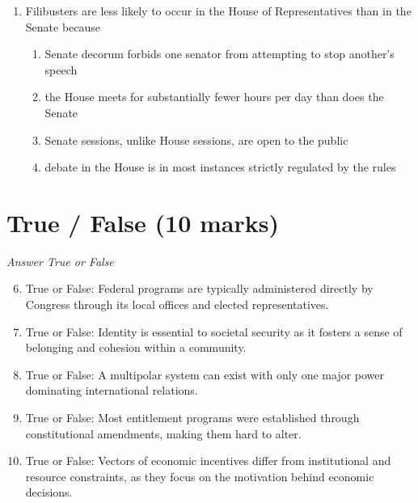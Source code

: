 \documentclass[12pt]{article}
\begin{document}
\begin{enumerate}[label=\arabic*.]
\begin{enumerate}[label=(\alph*)]
    \item Computer experts
    \item Anti-virus industry
    \item Computer networks
\end{enumerate}
\item Filibusters are less likely to occur in the House of Representatives than in the Senate because
\begin{enumerate}[label=(\alph*)]
    \item Senate decorum forbids one senator from attempting to stop another's speech
    \item the House meets for substantially fewer hours per day than does the Senate
    \item Senate sessions, unlike House sessions, are open to the public
    \item debate in the House is in most instances strictly regulated by the rules
\end{enumerate}
\end{enumerate}

\section*{True / False (10 marks)}
\textit{Answer True or False}
\begin{enumerate}[label=\arabic*.]
\setcounter{enumi}{5}
\item True or False: Federal programs are typically administered directly by Congress through its local offices and elected representatives.
\item True or False: Identity is essential to societal security as it fosters a sense of belonging and cohesion within a community.
\item True or False: A multipolar system can exist with only one major power dominating international relations.
\item True or False: Most entitlement programs were established through constitutional amendments, making them hard to alter.
\item True or False: Vectors of economic incentives differ from institutional and resource constraints, as they focus on the motivation behind economic decisions.
\end{enumerate}
\end{document}

